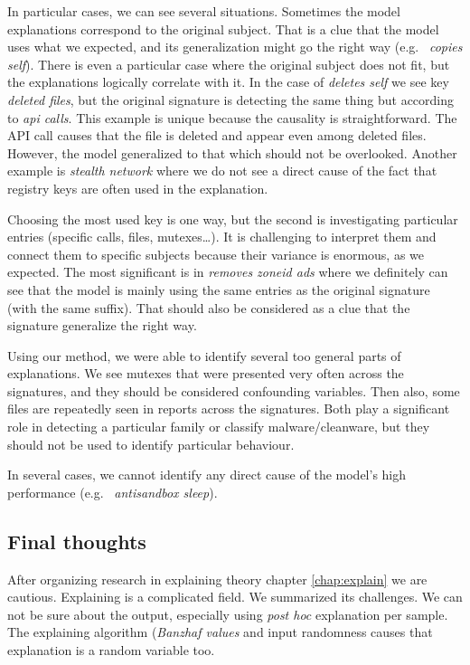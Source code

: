 In particular cases, we can see several situations. Sometimes the model explanations correspond to the original subject. That is a clue that the model uses what we expected, and its generalization might go the right way (e.g. \ \emph{copies self}). There is even a particular case where the original subject does not fit, but the explanations logically correlate with it. In the case of \emph{deletes self} we see key \emph{deleted files}, but the original signature is detecting the same thing but according to \emph{api calls}. This example is unique because the causality is straightforward. The API call causes that the file is deleted and appear even among deleted files. However, the model generalized to that which should not be overlooked. Another example is \emph{stealth network} where we do not see a direct cause of the fact that registry keys are often used in the explanation.

Choosing the most used key is one way, but the second is investigating particular entries (specific calls, files, mutexes\dots). It is challenging to interpret them and connect them to specific subjects because their variance is enormous, as we expected. The most significant is in \emph{removes zoneid ads} where we definitely can see that the model is mainly using the same entries as the original signature (with the same suffix). That should also be considered as a clue that the signature generalize the right way.

Using our method, we were able to identify several too general parts of explanations. We see mutexes that were presented very often across the signatures, and they should be considered confounding variables. Then also, some files are repeatedly seen in reports across the signatures. Both play a significant role in detecting a particular family or classify malware/cleanware, but they should not be used to identify particular behaviour.

In several cases, we cannot identify any direct cause of the model's high performance (e.g. \ \emph{antisandbox sleep}).


\subsection{Final thoughts}
After organizing research in explaining theory chapter \ref{chap:explain} we are cautious. Explaining is a complicated field. We summarized its challenges. We can not be sure about the output, especially using \emph{post hoc} explanation per sample. The explaining algorithm (\emph{Banzhaf values} and  input randomness causes that explanation is a random variable too. 

